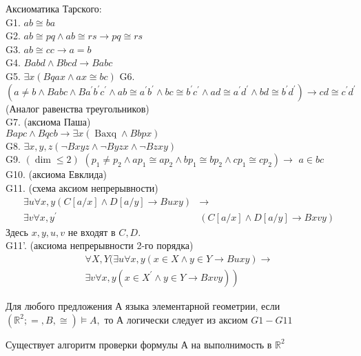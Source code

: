 Аксиоматика Тарского:\\
G1. $a b \cong b a$\\
G2. $a b \cong p q \wedge a b \cong r s \rightarrow p q \cong r s$\\
G3. $a b \cong c c \rightarrow a=b$\\
G4. $Babd \wedge Bbcd \rightarrow Babc$\\
G5. $\exists x( Bqax \wedge a x \cong b c)$
G6. $(a \neq b \wedge B a b c \wedge B a^{\prime} b^{\prime} c^{\prime} \wedge a b \cong a^{\prime} b^{\prime} \wedge b c \cong b^{\prime} c^{\prime} \wedge a d \cong a^{\prime} d^{\prime} \wedge b d \cong b^{\prime} d^{\prime}) \rightarrow c d \cong c^{\prime} d^{\prime}$ (Аналог равенства треугольников)\\
G7. (аксиома Паша)\\
$Bapc \wedge B q c b \rightarrow \exists x(\operatorname{Baxq} \wedge B b p x)$\\
G8. $\exists x, y, z(\neg B x y z \wedge \neg B y z x \wedge \neg B z x y)$\\
G9. $(\operatorname{dim} \leq 2)$
$\left(p_{1} \neq p_{2} \wedge a p_{1} \cong a p_{2} \wedge b p_{1} \cong b p_{2} \wedge c p_{1} \cong c p_{2}\right) \rightarrow$
$a \in b c$\\
G10. (аксиома Евклида)\\
G11. (схема аксиом непрерывности)
$$
\begin{aligned}
\exists u \forall x, y(C[a / x] \wedge D[a / y] \rightarrow B u x y) & \rightarrow \\
\exists v \forall x, y^{\prime} &(C[a / x] \wedge D[a / y] \rightarrow B x v y)
\end{aligned}
$$
Здесь $x, y, u, v$ не входят в $C, D .$\\
G11'. (аксиома непрерывности 2-го порядка)
$$
\begin{array}{r}
\forall X, Y(\exists u \forall x, y(x \in X \wedge y \in Y \rightarrow B u x y) \rightarrow \\
\left.\exists v \forall x, y\left(x \in X^{\prime} \wedge y \in Y \rightarrow B x v y\right)\right)
\end{array}
$$
\vskip 0.2in
\begin{theo} 
Для любого предложения А языка элементарной геометрии, если $\left(\mathbb{R}^{2} ;=, B, \cong\right) \vDash A,$ то А логически следует из аксиом $G 1-G 11$
\end{theo}
\begin{theo}
Существует алгоритм проверки формулы А на выполнимость в $\mathbb{R}^{2}$
\end{theo}